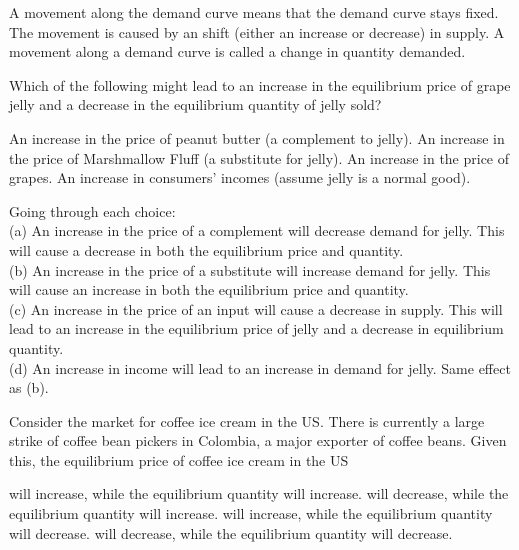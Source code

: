 \documentclass[addpoints,11pt]{exam}
\theoremstyle{definition}
\begin{document}
\begin{questions}
\begin{solution}
	A movement along the demand curve means that the demand curve stays fixed. The movement is caused by an shift (either an increase or decrease) in supply. A movement along a demand curve is called a change in quantity demanded.
\end{solution}

\question Which of the following might lead to an increase in the equilibrium price of grape jelly and a decrease in the equilibrium quantity of jelly sold?

\begin{choices}
	\choice An increase in the price of peanut butter (a complement to jelly).
	\choice An increase in the price of Marshmallow Fluff (a substitute for jelly).
	\CorrectChoice An increase in the price of grapes.
	\choice An increase in consumers' incomes (assume jelly is a normal good).
\end{choices}

\begin{solution}
	Going through each choice: \\
	(a) An increase in the price of a complement will decrease demand for jelly. This will cause a decrease in both the equilibrium price and quantity. \\
	(b) An increase in the price of a substitute will increase demand for jelly. This will cause an increase in both the equilibrium price and quantity. \\
	(c) An increase in the price of an input will cause a decrease in supply. This will lead to an increase in the equilibrium price of jelly and a decrease in equilibrium quantity. \\
	(d) An increase in income will lead to an increase in demand for jelly. Same effect as (b).
\end{solution}

	\question Consider the market for coffee ice cream in the US. There is currently a large strike of coffee bean pickers in Colombia, a major exporter of coffee beans. Given this, the equilibrium price of coffee ice cream in the US
	
	\begin{choices}
		\choice will increase, while the equilibrium quantity will increase.
		\choice will decrease, while the equilibrium quantity will increase.
		\CorrectChoice will increase, while the equilibrium quantity will decrease.
		\choice will decrease, while the equilibrium quantity will decrease.
	\end{choices}
	

\end{questions}
\end{document}

